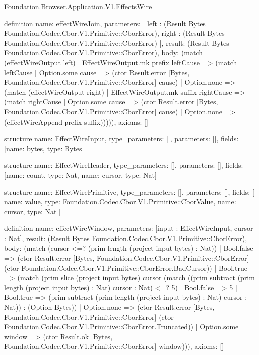 \begin{lexlean}{Foundation.Browser.Application.V1.EffectsWire}
\begin{semanticmodule}
definition{
  name: effectWireJoin,
  parameters: [
    left : (Result Bytes Foundation.Codec.Cbor.V1.Primitive::CborError),
    right : (Result Bytes Foundation.Codec.Cbor.V1.Primitive::CborError)
  ],
  result: (Result Bytes Foundation.Codec.Cbor.V1.Primitive::CborError),
  body: (match (effectWireOutput left)
    | EffectWireOutput.mk prefix leftCause => (match leftCause
      | Option.some cause => (ctor Result.error [Bytes, Foundation.Codec.Cbor.V1.Primitive::CborError] cause)
      | Option.none => (match (effectWireOutput right)
        | EffectWireOutput.mk suffix rightCause => (match rightCause
          | Option.some cause => (ctor Result.error [Bytes, Foundation.Codec.Cbor.V1.Primitive::CborError] cause)
          | Option.none => (effectWireAppend prefix suffix))))),
  axioms: []
}

structure{
  name: EffectWireInput,
  type_parameters: [],
  parameters: [],
  fields: [{name: bytes, type: Bytes}]
}

structure{
  name: EffectWireHeader,
  type_parameters: [],
  parameters: [],
  fields: [{name: count, type: Nat}, {name: cursor, type: Nat}]
}

structure{
  name: EffectWirePrimitive,
  type_parameters: [],
  parameters: [],
  fields: [
    {name: value, type: Foundation.Codec.Cbor.V1.Primitive::CborValue},
    {name: cursor, type: Nat}
  ]
}

definition{
  name: effectWireWindow,
  parameters: [input : EffectWireInput, cursor : Nat],
  result: (Result Bytes Foundation.Codec.Cbor.V1.Primitive::CborError),
  body: (match (cursor <=? (prim length (project input bytes) : Nat))
    | Bool.false => (ctor Result.error [Bytes, Foundation.Codec.Cbor.V1.Primitive::CborError] (ctor Foundation.Codec.Cbor.V1.Primitive::CborError.BadCursor))
    | Bool.true => (match (prim slice (project input bytes) cursor (match ((prim subtract (prim length (project input bytes) : Nat) cursor : Nat) <=? 5)
        | Bool.false => 5
        | Bool.true => (prim subtract (prim length (project input bytes) : Nat) cursor : Nat)) : (Option Bytes))
      | Option.none => (ctor Result.error [Bytes, Foundation.Codec.Cbor.V1.Primitive::CborError] (ctor Foundation.Codec.Cbor.V1.Primitive::CborError.Truncated))
      | Option.some window => (ctor Result.ok [Bytes, Foundation.Codec.Cbor.V1.Primitive::CborError] window))),
  axioms: []
}


\end{semanticmodule}
\end{lexlean}
